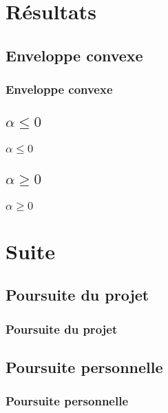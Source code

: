 \documentclass{beamer}
\begin{document}
\section{Résultats} 

\subsection{Enveloppe convexe} 
\begin{frame}
\frametitle{Enveloppe convexe}
\end{frame}

\subsection{$\alpha \leq 0$} 
\begin{frame}
\frametitle{$\alpha \leq 0$}
\end{frame}

\subsection{$\alpha \geq 0$} 
\begin{frame}
\frametitle{$\alpha \geq 0$}
\end{frame}

\section{Suite} 

\subsection{Poursuite du projet} 
\begin{frame}
\frametitle{Poursuite du projet}
\end{frame}

\subsection{Poursuite personnelle} 
\begin{frame}
\frametitle{Poursuite personnelle}
\end{frame}

\end{document}
